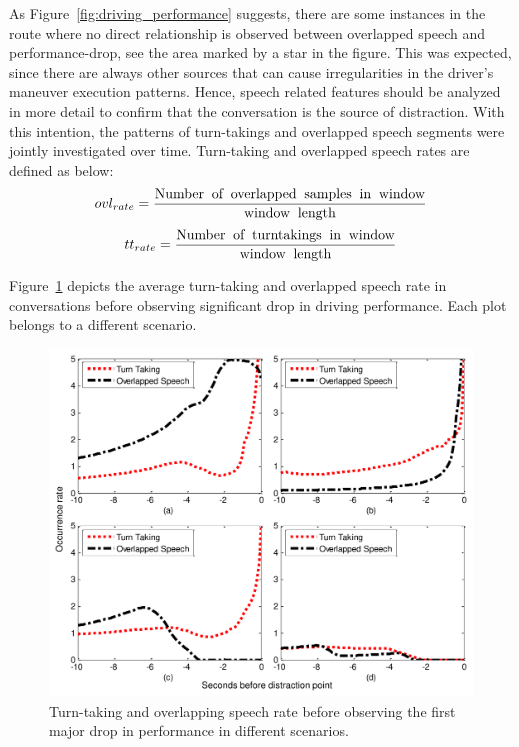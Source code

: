 As Figure~\ref{fig:driving_performance} suggests, there are some instances in the route where no direct relationship is observed between overlapped speech and performance-drop, see the area marked by a star in the figure. 
This was expected, since there are always other sources that can cause irregularities in the driver's maneuver execution patterns. 
Hence, speech related features should be analyzed in more detail to confirm that the conversation is the source of distraction. 
With this intention, the patterns of turn-takings and overlapped speech segments were jointly investigated over time. 
Turn-taking and overlapped speech rates are defined as below:
\begin{equation}
ovl_{rate} = \dfrac{\textrm{Number\: of\: overlapped\: samples\: in\: window}}{\textrm{window\: length}} \nonumber
\end{equation}
\begin{equation}
tt_{rate} = \dfrac{\textrm{Number\: of\: turntakings\: in\: window}}{\textrm{window\: length}} \nonumber
\end{equation}

Figure~\ref{fig:turntaking_and_overlap} depicts the average turn-taking and overlapped speech rate in conversations before observing significant drop in driving performance. 
Each plot belongs to a different scenario. 

\begin{figure}[h!]
	\vspace{-5mm}
	\centering
	\includegraphics[scale=0.5]{figures/ttr_and_ovl}
	\caption {Turn-taking and overlapping speech rate before observing the first major drop in performance in different scenarios.}
	\label{fig:turntaking_and_overlap} 
\end{figure}

